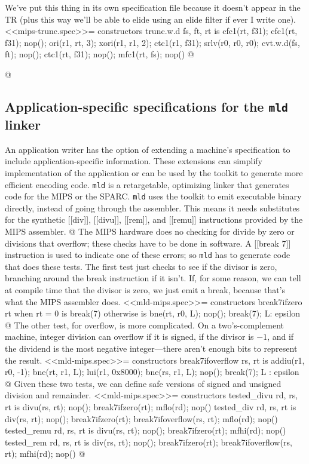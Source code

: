 {{We've put this thing in its own specification file because it doesn't
appear in the TR (plus this way we'll be able to elide using an elide
filter if ever I write one).
<<mips-trunc.spec>>=
constructors
  trunc.w.d fs, ft, rt is 
    cfc1(rt, f31); 
    cfc1(rt, f31);   nop(); 
    ori(r1, rt, 3);
    xori(r1, r1, 2); 
    ctc1(r1, f31); 
    srlv(r0, r0, r0);
    cvt.w.d(fs, ft); nop();
    ctc1(rt, f31);   nop(); 
    mfc1(rt, fs);    nop()
@ \fi 

@
\subsection{Application-specific specifications for the {\tt mld} linker}

An application writer has the option of extending a machine's specification
to include application-specific information.
These extensions can simplify implementation of the application or
can be used by the toolkit to generate more efficient
encoding code.
{\tt mld} is a retargetable, optimizing linker that generates code for
the MIPS or the SPARC.
{\tt mld} uses the toolkit to emit executable binary directly, instead
of going through the assembler.
This means it needs substitutes for the synthetic [[div]], [[divu]], [[rem]],
and [[remu]] instructions provided by the MIPS assembler.
@
The MIPS hardware does no checking for divide by zero or divisions
that overflow; these checks have to be done in software.
A [[break 7]] instruction is used to indicate one of these errors; so
{\tt mld} has to generate code that does these tests.
The first test just checks to see if the divisor is zero, branching
around the break instruction if it isn't.
If, for some reason, we can tell at compile time that the
divisor is zero, we just emit a break, because that's what the MIPS
assembler does.
<<mld-mips.spec>>=
constructors
  break7ifzero rt
    when { rt = 0 } is break(7)
    otherwise       is bne(rt, r0, L); nop(); break(7); L: epsilon
@
The other test, for overflow, is more complicated.
On a two's-complement machine,
integer division can overflow if it is signed, if the divisor is $-1$,
and if the dividend is the most negative integer---there aren't enough
bits to represent the result.
<<mld-mips.spec>>=
constructors
  break7ifoverflow rs, rt is
        addiu(r1, r0, -1);
        bne(rt, r1, L);   
        lui(r1, 0x8000);  
        bne(rs, r1, L);   
        nop();            
    	break(7);
    L : epsilon
@
Given these two tests, we can define safe versions of signed and
unsigned division and remainder.
<<mld-mips.spec>>=
constructors
  tested_divu rd, rs, rt
    is divu(rs, rt); nop(); break7ifzero(rt); mflo(rd); nop()
  tested_div rd, rs, rt
    is div(rs, rt);  nop(); break7ifzero(rt); break7ifoverflow(rs, rt); mflo(rd); nop()
  tested_remu rd, rs, rt
    is divu(rs, rt); nop(); break7ifzero(rt); mfhi(rd); nop()
  tested_rem rd, rs, rt
    is div(rs, rt);  nop(); break7ifzero(rt); break7ifoverflow(rs, rt); mfhi(rd); nop()
@

}}
